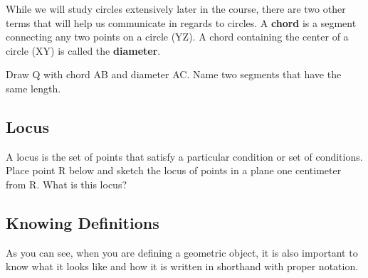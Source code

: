 \begin{center}
\end{center}

While we will study circles extensively later in the course, there are two other terms that will help us communicate in regards to circles.  A \textbf{chord} is a segment connecting any two points on a circle (\seg YZ).  A chord containing the center of a circle (\seg XY) is called the \textbf{diameter}.\\

\begin{center}
\end{center}

\noindent \q  Draw \cir Q with chord \seg AB and diameter \seg AC. \aq Name two segments that have the same length.

\bigskip

\subsection{Locus}

A locus is the set of points that satisfy a particular condition or set of conditions. \aq Place point \pnt R below and sketch the locus of points in a plane one centimeter from \pnt R.  What is this locus?

\smallskip

\subsection{Knowing Definitions}

As you can see, when you are defining a geometric object, it is also important to know what it looks like and how it is written in shorthand with proper notation.

